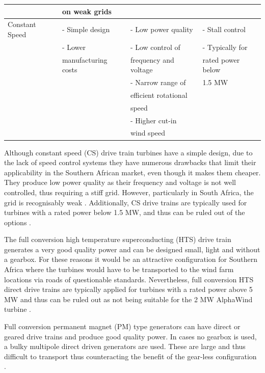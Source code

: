 \begin{table}[H]
\begin{tabular}{ |l|l|l|l| }
  & on weak grids & & \\
  \hline
  Constant Speed & - Simple design & - Low power quality & - Stall control \\
   & - Lower & - Low control of & - Typically for  \\
   & manufacturing costs & frequency and voltage & rated power below \\
   & & - Narrow range of & 1.5 MW \\
   & & efficient rotational & \\
   & & speed & \\
   & & - Higher cut-in & \\
   & & wind speed & \\
  \hline
 \end{tabular}
\end{table}

\newpage
Although constant speed (CS) drive train turbines have a simple design, due to the lack of speed control systems they have numerous drawbacks that limit their applicability in the Southern African market, even though it makes them cheaper. They produce low power quality as their frequency and voltage is not well controlled, thus requiring a stiff grid. However, particularly in South Africa, the grid is recognisably weak \cite{onishi}. Additionally, CS drive trains are typically used for turbines with a rated power below 1.5 MW, and thus can be ruled out of the options  \cite{mcgahan}.

The full conversion high temperature superconducting (HTS) drive train generates a very good quality power and can be designed small, light and without a gearbox. For these reasons it would be an attractive configuration for Southern Africa where the turbines would have to be transported to the wind farm locations via roads of questionable standards. Nevertheless, full conversion HTS direct drive trains are typically applied for turbines with a rated power above 5 MW and thus can be ruled out as not being suitable for the 2 MW AlphaWind turbine \cite{mcgahan}.

Full conversion permanent magnet (PM) type generators can have direct or geared drive trains and produce good quality power. In cases no gearbox is used, a bulky multipole direct driven generators are used. These are large and thus difficult to transport thus counteracting the benefit of the gear-less configuration \cite{hansen}.

